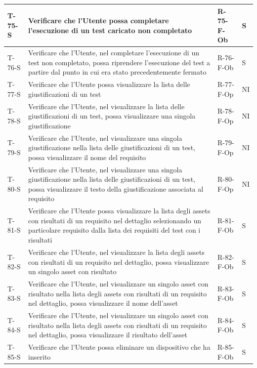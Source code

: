 \documentclass[a4paper,12pt]{article}
\begin{document}
{{\begin{longtable}{|p{}|p{}|p{}|p{}|}
                T-75-S & Verificare che l'Utente possa completare l'esecuzione di un test caricato non completato & R-75-F-Ob & S \\ \hline
                T-76-S & Verificare che l'Utente, nel completare l'esecuzione di un test non completato, possa riprendere l'esecuzione del test a partire dal punto in cui era stato precedentemente fermato & R-76-F-Ob & S \\ \hline
                T-77-S & Verificare che l'Utente possa visualizzare la lista delle giustificazioni di un test & R-77-F-Op & NI \\ \hline
                T-78-S & Verificare che l'Utente, nel visualizzare la lista delle giustificazioni di un test, possa visualizzare una singola giustificazione & R-78-F-Op & NI \\ \hline
                T-79-S & Verificare che l'Utente, nel visualizzare una singola giustificazione nella lista delle giustificazioni di un test, possa visualizzare il nome del requisito & R-79-F-Op & NI \\ \hline
                T-80-S & Verificare che l'Utente, nel visualizzare una singola giustificazione nella lista delle giustificazioni di un test, possa visualizzare il testo della giustificazione associata al requisito & R-80-F-Op & NI \\ \hline
                T-81-S & Verificare che l'Utente possa visualizzare la lista degli assets con risultati di un requisito nel dettaglio selezionando un particolare requisito dalla lista dei requisiti del test con i risultati & R-81-F-Ob & S \\ \hline
                T-82-S & Verificare che l'Utente, nel visualizzare la lista degli assets con risultati di un requisito nel dettaglio, possa visualizzare un singolo asset con risultato & R-82-F-Ob & S \\ \hline
                T-83-S & Verificare che l'Utente, nel visualizzare un singolo asset con risultato nella lista degli assets con risultati di un requisito nel dettaglio, possa visualizzare il nome dell'asset & R-83-F-Ob & S \\ \hline
                T-84-S & Verificare che l'Utente, nel visualizzare un singolo asset con risultato nella lista degli assets con risultati di un requisito nel dettaglio, possa visualizzare il risultato dell'asset & R-84-F-Ob & S \\ \hline
                T-85-S & Verificare che l'Utente possa eliminare un dispositivo che ha inserito & R-85-F-Ob & S \\ \hline

\end{longtable}}}
\end{document}
